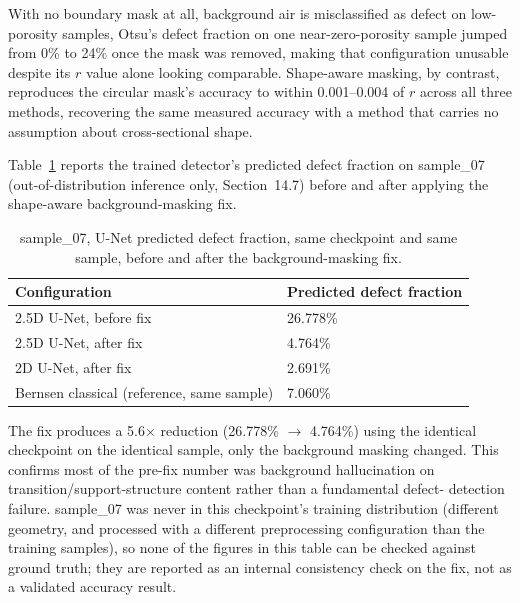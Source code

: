 With no boundary mask at all, background air is misclassified as defect on low-porosity samples, Otsu's
defect fraction on one near-zero-porosity sample jumped from 0\% to 24\% once the mask was removed,
making that configuration unusable despite its $r$ value alone looking comparable. Shape-aware masking,
by contrast, reproduces the circular mask's accuracy to within 0.001--0.004 of $r$ across all three
methods, recovering the same measured accuracy with a method that carries no assumption about
cross-sectional shape.

Table~\ref{tab:bg_mask_fix} reports the trained detector's predicted defect fraction on sample\_07
(out-of-distribution inference only, Section~14.7) before and after applying the shape-aware
background-masking fix.

\begin{table}[htbp]
\centering
\caption{sample\_07, U-Net predicted defect fraction, same checkpoint and same sample, before and
  after the background-masking fix.}
\label{tab:bg_mask_fix}
\begin{tabular}{ll}
\toprule
\textbf{Configuration} & \textbf{Predicted defect fraction} \\
\midrule
2.5D U-Net, before fix    & 26.778\% \\
2.5D U-Net, after fix     & 4.764\% \\
2D U-Net, after fix       & 2.691\% \\
Bernsen classical (reference, same sample) & 7.060\% \\
\bottomrule
\end{tabular}
\end{table}

The fix produces a 5.6$\times$ reduction (26.778\% $\to$ 4.764\%) using the identical checkpoint on the
identical sample, only the background masking changed. This confirms most of the pre-fix number was
background hallucination on transition/support-structure content rather than a fundamental defect-
detection failure. sample\_07 was never in this checkpoint's training distribution (different
geometry, and processed with a different preprocessing configuration than the training samples), so
none of the figures in this table can be checked against ground truth; they are reported as an
internal consistency check on the fix, not as a validated accuracy result.

